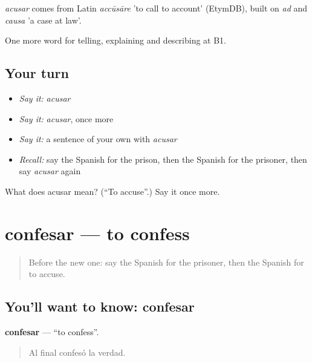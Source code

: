 \begin{cousinweb}
\emph{acusar} comes from Latin \emph{accūsāre} 'to call to account' (EtymDB), built on \emph{ad} and \emph{causa} 'a case at law'.
\end{cousinweb}

\begin{grammarlens}[title={What you've built}]
One more word for telling, explaining and describing at B1.
\end{grammarlens}

\subsection*{Your turn}
\begin{itemize}
\raggedright
  \item \emph{Say it:} \emph{acusar}
  \item \emph{Say it:} \emph{acusar}, once more
  \item \emph{Say it:} a sentence of your own with \emph{acusar}
  \item \emph{Recall:} say the Spanish for the prison, then the Spanish for the prisoner, then say \emph{acusar} again
\end{itemize}

\begin{tcolorbox}[breakable,colback=teal!4,colframe=teal!35!black,title={Before you move on}]
What does acusar mean? (\textquotedblleft{}To accuse\textquotedblright{}.) Say it once more.
\end{tcolorbox}
\section[confesar]{confesar — to confess}

\label{lesson:ES-C523-confesar}



\begin{quote}
Before the new one: say the Spanish for the prisoner, then the Spanish for to accuse.
\end{quote}

\subsection*{You'll want to know: confesar}
\textbf{confesar} — \textquotedblleft{}to confess\textquotedblright{}.

\begin{quote}
Al final confesó la verdad.
\end{quote}

